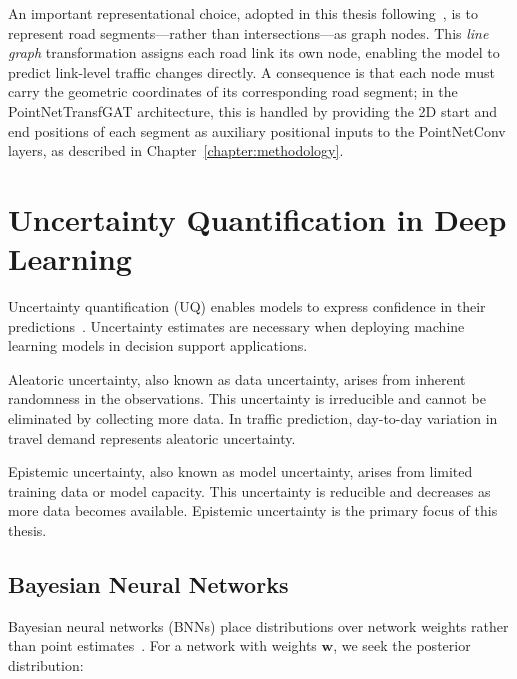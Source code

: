 An important representational choice, adopted in this thesis following~\textcite{natterer2025ml}, is to represent road segments---rather than intersections---as graph nodes. This \emph{line graph} transformation assigns each road link its own node, enabling the model to predict link-level traffic changes directly. A consequence is that each node must carry the geometric coordinates of its corresponding road segment; in the PointNetTransfGAT architecture, this is handled by providing the 2D start and end positions of each segment as auxiliary positional inputs to the PointNetConv layers, as described in Chapter~\ref{chapter:methodology}.

\section{Uncertainty Quantification in Deep Learning}\label{sec:uq}

Uncertainty quantification (UQ) enables models to express confidence in their predictions~\cite{abdar2021review, gawlikowski2023survey}. Uncertainty estimates are necessary when deploying machine learning models in decision support applications.

\begin{definition}
Aleatoric uncertainty, also known as data uncertainty, arises from inherent randomness in the observations. This uncertainty is irreducible and cannot be eliminated by collecting more data. In traffic prediction, day-to-day variation in travel demand represents aleatoric uncertainty.
\end{definition}

\begin{definition}
Epistemic uncertainty, also known as model uncertainty, arises from limited training data or model capacity. This uncertainty is reducible and decreases as more data becomes available. Epistemic uncertainty is the primary focus of this thesis.
\end{definition}

\subsection{Bayesian Neural Networks}

Bayesian neural networks (BNNs) place distributions over network weights rather than point estimates~\cite{mackay1992practical, neal1996bayesian}. For a network with weights $\mathbf{w}$, we seek the posterior distribution:

